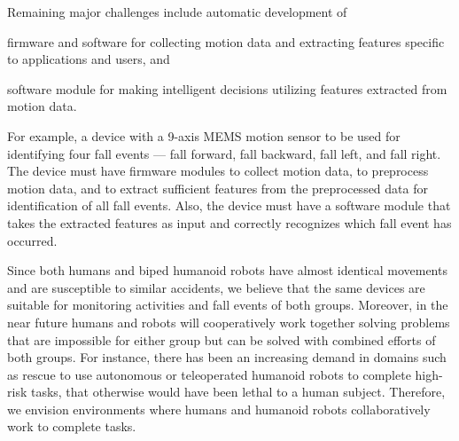 \documentclass[]{IEEEtran}
\begin{document}
\par
Remaining major challenges include automatic development of \begin{inparaenum}[($i$)] \item firmware and software for collecting motion data and  extracting features specific to applications and users, and \item software module for making intelligent decisions utilizing features extracted from motion data. \end{inparaenum}
For example, a device with a 9-axis MEMS motion sensor to be used for identifying four fall events --- fall forward, fall backward, fall left, and fall right. The device must have firmware modules to collect motion data, to preprocess motion data, and to extract sufficient features from the preprocessed data for identification of all fall events. Also, the device must have a software module that takes the extracted features as input and  correctly recognizes which fall event has occurred.


\par
Since both humans and biped humanoid robots have almost identical movements and are susceptible to 
similar accidents, we believe that the same devices are suitable for monitoring activities and fall events of both 
groups. Moreover, in the near future humans and robots will cooperatively work together solving problems that are impossible for either group but can be solved with  combined efforts of both groups.  For instance, there has been an increasing demand in 
domains such as rescue to use autonomous or teleoperated humanoid robots to complete high-risk 
tasks, that otherwise would have been lethal to a human subject. Therefore, we envision environments 
where humans and humanoid robots collaboratively work to complete tasks. 
\end{document}
